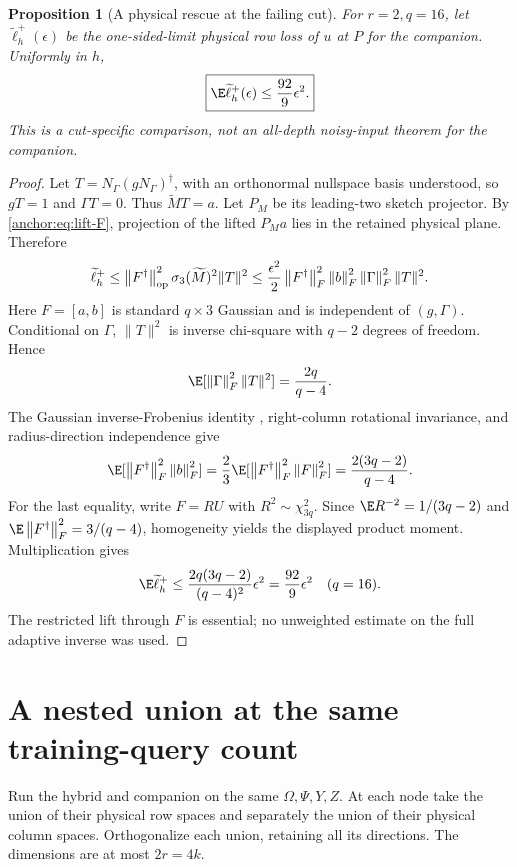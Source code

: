 \documentclass[11pt,oneside,openany,a4paper]{book}
\numberwithin{equation}{chapter}
\newtheorem{proposition}[theorem]{Proposition}
\theoremstyle{definition}
\theoremstyle{remark}
\newcommand{\F}[1]{\left\lVert#1\right\rVert_F}
\newcommand{\op}[1]{\left\lVert#1\right\rVert_{\rm op}}
\begin{document}
\begin{proposition}[A physical rescue at the failing cut]\label{anchor:prop:rescue}
For $r=2,q=16$, let $\widetilde\ell_h^+(\epsilon)$ be the one-sided-limit physical row loss of $u$ at $P$ for the companion. Uniformly in $h$,
\begin{equation}\label{anchor:eq:rescue}
 \boxed{\E\widetilde\ell_h^+(\epsilon)\le\frac{92}{9}\epsilon^2.}
\end{equation}
This is a cut-specific comparison, not an all-depth noisy-input theorem for the companion.
\end{proposition}
\begin{proof}
Let $T=N_\Gamma(gN_\Gamma)^\dagger$, with an orthonormal nullspace basis understood, so $gT=1$ and $\Gamma T=0$. Thus $\widetilde M T=a$. Let $P_M$ be its leading-two sketch projector. By \eqref{anchor:eq:lift-F}, projection of the lifted $P_Ma$ lies in the retained physical plane. Therefore
\[
 \widetilde\ell_h^+
 \le\op{F^\dagger}^2\sigma_3(\widetilde M)^2\|T\|^2
 \le\frac{\epsilon^2}{2}\F{F^\dagger}^2\F b^2\F\Gamma^2\|T\|^2.
\]
Here $F=[a,b]$ is standard $q\times3$ Gaussian and is independent of $(g,\Gamma)$. Conditional on $\Gamma$, $\|T\|^2$ is inverse chi-square with $q-2$ degrees of freedom. Hence
\[
 \E[\F\Gamma^2\|T\|^2]=\frac{2q}{q-4}.
\]
The Gaussian inverse-Frobenius identity \cite{HMT}, right-column rotational invariance, and radius-direction independence give
\[
 \E[\F{F^\dagger}^2\F b^2]
 =\frac23\E[\F{F^\dagger}^2\F F^2]
 =\frac{2(3q-2)}{q-4}.
\]
For the last equality, write $F=RU$ with $R^2\sim\chi^2_{3q}$. Since $\E R^{-2}=1/(3q-2)$ and $\E\F{F^\dagger}^2=3/(q-4)$, homogeneity yields the displayed product moment. Multiplication gives
\[
 \E\widetilde\ell_h^+\le
 \frac{2q(3q-2)}{(q-4)^2}\epsilon^2
 =\frac{92}{9}\epsilon^2\quad(q=16).
\]
The restricted lift through $F$ is essential; no unweighted estimate on the full adaptive inverse was used.
\end{proof}

\section{A nested union at the same training-query count}\label{anchor:sec:union}
Run the hybrid and companion on the same $\Omega,\Psi,Y,Z$. At each node take the union of their physical row spaces and separately the union of their physical column spaces. Orthogonalize each union, retaining all its directions. The dimensions are at most $2r=4k$.
\end{document}
